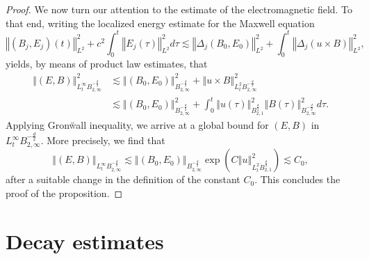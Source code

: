 \documentclass[11pt, leqno, a4paper,]{amsart}
\theoremstyle{remark}
\numberwithin{equation}{section}
\newcommand*{\norm}[1]{\left\Vert #1\right\Vert}
\begin{document}
\begin{proof}
 We now turn our attention to the estimate of the electromagnetic field. To that end, writing the localized energy estimate for the Maxwell equation
 \begin{equation*}
 	\norm {(B_j,E_j)(t)}_{L^2}^2 + c^2 \int_0^t \norm {E_j(\tau)}_{L^2}^2 d\tau \lesssim  \norm {\Delta_j(B_0,E_0)}_{L^2}^2  + \int_0^t \norm {\Delta_j (u\times B)}_{L^2}^2,
 \end{equation*} 
 yields, by means of product law estimates, that 
 \begin{equation*}
 	\begin{aligned}
 		\norm {(E,B)}_{L^\infty_t B^{-\frac{d}{2}}_{2,\infty}} ^2
 		& \lesssim  \norm { (B_0,E_0)}_{B^{-\frac{d}{2}}_{2,\infty}}^2  +   \norm { u\times B}_{ L^2_t B^{-\frac{d}{2}}_{2,\infty}}^2
 		\\
 		& \lesssim  \norm { (B_0,E_0)}_{B^{-\frac{d}{2}}_{2,\infty}}^2  +  \int_0^t  \norm { u (\tau)}_{  B^{\frac{d}{2}}_{2,1}}^2 \norm {   B  (\tau) }_{   B^{-\frac{d}{2}}_{2,\infty}}^2 d\tau.
 	\end{aligned}
 \end{equation*}
 Applying Gron\"wall inequality, we arrive at a global bound for  $(E,B)$ in $L^\infty_t B^{-\frac{d}{2}}_{2,\infty}$. More precisely, we find that  \begin{equation*}
 	\norm {(E,B)}_{L^\infty_t B^{-\frac{d}{2}}_{2,\infty}}  \lesssim  \norm { (B_0,E_0)}_{B^{-\frac{d}{2}}_{2,\infty}} \exp\left( C  \norm { u }_{L^2_t \dot B^{\frac{d}{2}}_{2,1}}^2  \right) \lesssim   C_0,
 \end{equation*}
 after a suitable change in the definition of the constant $C_0$. This concludes the proof of the proposition.
\end{proof}


  
  \section{Decay estimates }
  
\end{document}
